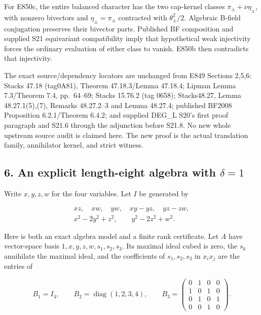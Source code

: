 For E850c, the entire balanced character has the two cap-kernel
classes \(\pi_\pm+\nu\eta_\pm\), with nonzero bivectors and
\(\eta_{\pm}=\pi_{\pm}\) contracted with \(\theta_\pm^2/2\). Algebraic B-field
conjugation preserves their bivector parts. Published BF composition
and supplied S21 equivariant compatibility imply that hypothetical
weak injectivity forces the ordinary evaluation of either class to
vanish. E850b then contradicts that injectivity.

The exact source/dependency locators are unchanged from E849 Sections
2,5,6: Stacks 47.18 (tag0A81), Theorem 47.18.3/Lemma 47.18.4;\cite{SFStacksE847LocalDuality} Lipman
Lemma 7.3/Theorem 7.4, pp.~64--69;\cite{SFLipman1984} Stacks 15.76.2 (tag 0658);\cite{SF-StacksPerfect} Stacks48.27,
Lemma 48.27.1(5),(7), Remarks 48.27.2--3 and Lemma 48.27.4;\cite{SFStacksE846Duality} published
BF2008 Proposition 6.2.1/Theorem 6.4.2;\cite{SF-BF2008} and supplied DEG\_L S20's first
proof paragraph and S21.6 through the adjunction before S21.8.
No new whole upstream source audit is claimed here. The new proof is
the actual translation family, annihilator kernel, and strict witness.

\subsection{6. An explicit length-eight algebra with \(\delta=1\)}\label{SF-E850:s6}

Write \(x,y,z,w\) for the four variables. Let \(I\) be generated by

\[
 \begin{gathered}
 xz,\quad xw,\quad yw,\quad xy-yz,\quad yz-zw,\\
 x^2-2y^2+z^2,\qquad y^2-2z^2+w^2.
 \end{gathered}
 \tag{TR.24}
\]

Here is both an exact algebra model and a finite rank certificate.
Let \(A\) have vector-space basis \(1,x,y,z,w,s_1,s_2,s_3\). Its maximal
ideal cubed is zero, the \(s_k\) annihilate the maximal ideal, and the
coefficients of \(s_1,s_2,s_3\) in \(x_ix_j\) are the entries of

\[
 B_1=I_4,\qquad B_2=\operatorname{diag}(1,2,3,4),\qquad
 B_3=\begin{pmatrix}
 0&1&0&0\\1&0&1&0\\0&1&0&1\\0&0&1&0
 \end{pmatrix}.
 \tag{TR.25}
\]

